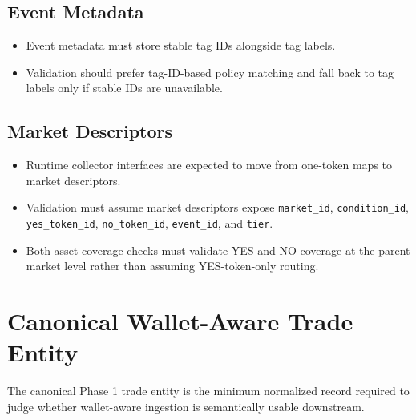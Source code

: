 \documentclass{article}
\begin{document}
\subsection*{Event Metadata}
\begin{itemize}
\item Event metadata must store stable tag IDs alongside tag labels.
\item Validation should prefer tag-ID-based policy matching and fall back to tag
labels only if stable IDs are unavailable.
\end{itemize}

\subsection*{Market Descriptors}
\begin{itemize}
\item Runtime collector interfaces are expected to move from one-token maps to
market descriptors.
\item Validation must assume market descriptors expose
\texttt{market\_id}, \texttt{condition\_id}, \texttt{yes\_token\_id},
\texttt{no\_token\_id}, \texttt{event\_id}, and \texttt{tier}.
\item Both-asset coverage checks must validate YES and NO coverage at the parent
market level rather than assuming YES-token-only routing.
\end{itemize}

\section*{Canonical Wallet-Aware Trade Entity}

The canonical Phase 1 trade entity is the minimum normalized record required to
judge whether wallet-aware ingestion is semantically usable downstream.
\end{document}

